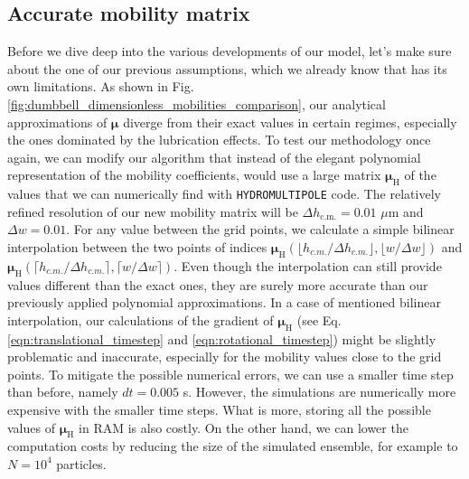 \documentclass{master_thesis}
\def\code#1{\texttt{#1}}
\begin{document}
\subsection{Accurate mobility matrix}

Before we dive deep into the various developments of our model, let's make sure about the one of our previous assumptions, which we already know that has its own limitations. As shown in Fig. \ref{fig:dumbbell_dimensionless_mobilities_comparison}, our analytical approximations of $\boldsymbol{\mu}$ diverge from their exact values in certain regimes, especially the ones dominated by the lubrication effects. To test our methodology once again, we can modify our algorithm that instead of the elegant polynomial representation of the mobility coefficients, would use a large matrix $\bm{\mu}_{\textrm{H}}$ of the values that we can numerically find with \code{HYDROMULTIPOLE} code. The relatively refined resolution of our new mobility matrix will be $\Delta h_{\textrm{c.m.}} = 0.01$ $\mu$m and $\Delta w=0.01$. For any value between the grid points, we calculate a simple bilinear interpolation between the two points of indices $\bm{\mu}_{\textrm{H}}(\lfloor h_{c.m.}/\Delta h_{c.m.} \rfloor, \lfloor w / \Delta w \rfloor)$ and $\bm{\mu}_{\textrm{H}}(\lceil h_{c.m.}/\Delta h_{c.m.} \rceil, \lceil w / \Delta w \rceil)$. Even though the interpolation can still provide values different than the exact ones, they are surely more accurate than our previously applied polynomial approximations. In a case of mentioned bilinear interpolation, our calculations of the gradient of $\bm{\mu}_{\textrm{H}}$ (see Eq. \eqref{eqn:translational_timestep} and \eqref{eqn:rotational_timestep}) might be slightly problematic and inaccurate, especially for the mobility values close to the grid points. To  mitigate the possible numerical errors, we can use a smaller time step than before, namely $dt = 0.005$ s. However, the simulations are numerically more expensive with the smaller time steps. What is more, storing all the possible values of $\bm{\mu}_{\textrm{H}}$ in RAM is also costly. On the other hand, we can lower the computation costs by reducing the size of the simulated ensemble, for example to $N=10^4$ particles.
\end{document}

